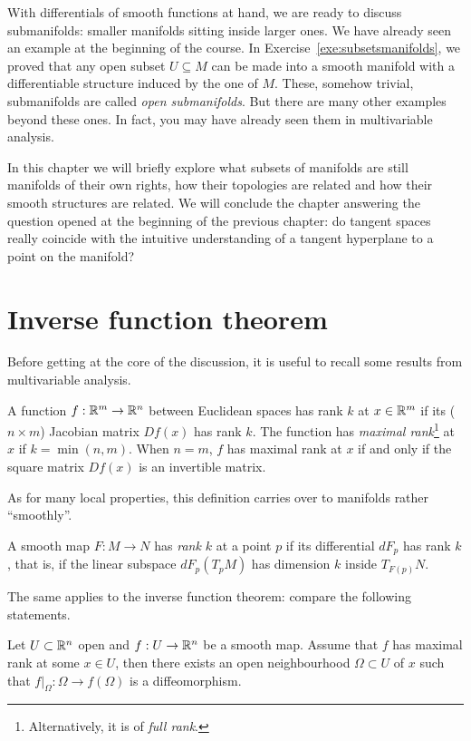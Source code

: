 With differentials of smooth functions at hand, we are ready to discuss submanifolds: smaller manifolds sitting inside larger ones.
We have already seen an example at the beginning of the course.
In Exercise~\ref{exe:subsetsmanifolds}, we proved that any open subset $U\subseteq M$ can be made into a smooth manifold with a differentiable structure induced by the one of $M$.
These, somehow trivial, submanifolds are called \emph{open submanifolds}.
But there are many other examples beyond these ones.
In fact, you may have already seen them in multivariable analysis.

In this chapter we will briefly explore what subsets of manifolds are still manifolds of their own rights, how their topologies are related and how their smooth structures are related.
We will conclude the chapter answering the question opened at the beginning of the previous chapter: do tangent spaces really coincide with the intuitive understanding of a tangent hyperplane to a point on the manifold?

\section{Inverse function theorem}

Before getting at the core of the discussion, it is useful to
recall some results from multivariable analysis.

A function $f:\mathbb{R}^m \to \mathbb{R}^n$ between Euclidean spaces has rank $k$ at $x\in\mathbb{R}^m$ if its ($n\times m$) Jacobian matrix $Df(x)$ has rank $k$.
The function has \emph{maximal rank}\footnote{Alternatively, it is of \emph{full rank}.} at $x$ if $k = \min(n,m)$.
When $n=m$, $f$ has maximal rank at $x$ if and only if the square matrix $Df(x)$ is an invertible matrix.

As for many local properties, this definition carries over to manifolds rather ``smoothly''.
%
\begin{definition}
    A smooth map $F:M\to N$ has \emph{rank $k$} at a point $p$ if its differential $dF_p$ has rank $k$, that is, if the linear subspace $dF_p(T_pM)$ has dimension $k$ inside $T_{F(p)}N$.
\end{definition}
%
The same applies to the inverse function theorem:
compare the following statements.
%
\begin{theorem}\label{thm:ift}
  Let $U\subset\mathbb{R}^n$ open and $f:U \to \mathbb{R}^n$ be a smooth map.
  Assume that $f$ has maximal rank at some $x\in U$, then there exists an open neighbourhood $\Omega\subset U$ of $x$ such that  $f\big|_\Omega : \Omega \to f(\Omega)$ is a diffeomorphism.
\end{theorem}

